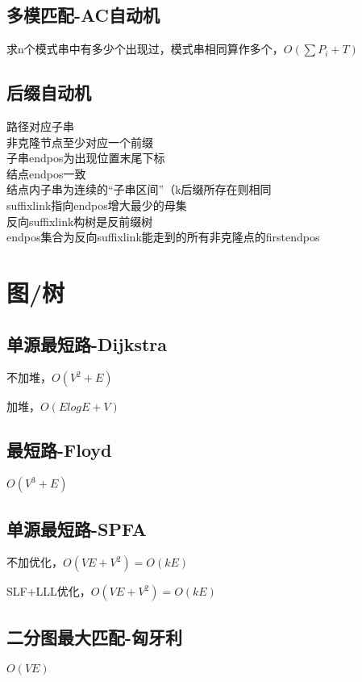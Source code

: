 \documentclass[10pt]{article}
\begin{document}
\subsection{多模匹配-AC自动机}
求n个模式串中有多少个出现过，模式串相同算作多个，$O(\sum P_i+T)$


\subsection{后缀自动机}
路径对应子串\\
非克隆节点至少对应一个前缀\\
子串endpos为出现位置末尾下标\\
结点endpos一致\\
结点内子串为连续的“子串区间”（k后缀所存在则相同\\
suffixlink指向endpos增大最少的母集\\
反向suffixlink构树是反前缀树\\
endpos集合为反向suffixlink能走到的所有非克隆点的firstendpos\\

\section{图/树}
\subsection{单源最短路-Dijkstra}
不加堆，$O(V^2+E)$

加堆，$O(ElogE+V)$


\subsection{最短路-Floyd}
$O(V^3+E)$


\subsection{单源最短路-SPFA}
不加优化，$O(VE+V^2)=O(kE)$

SLF+LLL优化，$O(VE+V^2)=O(kE)$


\subsection{二分图最大匹配-匈牙利}
$O(VE)$

\end{document}
